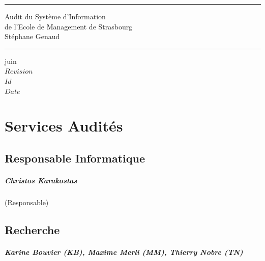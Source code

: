 \documentclass{book}
\begin{document}
\newcommand{\motcle}[1]{\index{#1}\emph{#1}}
\newcommand{\instrcle}[1]{\index{\texttt{#1}}\texttt{#1}}

\thispagestyle{empty}
\rhead[]{}
\pagestyle{fancy}
\setlength{\parindent}{0mm}
\setlength{\parskip}{0mm}
\rule{\linewidth}{1mm}
\begin{center}
\Large{Audit du Système d'Information}\\[5mm]
\Large{de l'Ecole de Management de Strasbourg}\\[5mm]
\large{Stéphane Genaud}
\rule{\linewidth}{1mm}
\end{center}
\begin{center}
juin  \\
\textrm{
$Revision$\\
$Id$\\
$Date$\\
}
\end{center}

\tableofcontents
\newpage

 
 

\chapter{Services Audités}
 

\section{Responsable Informatique}

\paragraph{Christos Karakostas} (Responsable)


\section{Recherche}
\paragraph{Karine Bouvier (KB), Maxime Merli (MM), Thierry Nobre (TN)}
\end{document}
